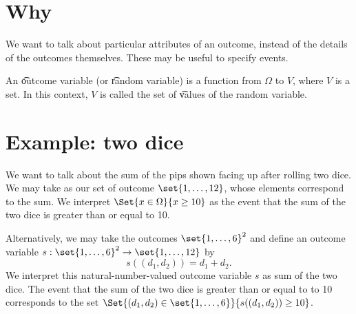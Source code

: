 

\section*{Why}

We want to talk about particular attributes of an outcome, instead of the details of the outcomes themselves.
These may be useful to specify events.

An \t{outcome variable} (or \t{random variable}) is a function from $\Omega $ to $V$, where $V$ is a set.
In this context, $V$ is called the set of \t{values} of the random variable.

\section*{Example: two dice}

We want to talk about the sum of the pips shown facing up after rolling two dice.
We may take as our set of outcome $\set{1, \dots , 12}$, whose elements correspond to the sum.
We interpret $\Set{x \in \Omega }{x \geq 10}$ as the event that the sum of the two dice is greater than or equal to 10.

Alternatively, we may take the outcomes $\set{1, \dots , 6}^2$ and define an outcome variable $s: \set{1, \dots , 6}^2 \to \set{1, \dots , 12}$ by
\[
s((d_1, d_2)) = d_1 + d_2.
\]
We interpret this natural-number-valued outcome variable $s$ as sum of the two dice.
The event that the sum of the two dice is greater than or equal to to 10 corresponds to the set $\Set{(d_1, d_2) \in \set{1, \dots , 6}}{s((d_1, d_2)) \geq 10}$.

\blankpage